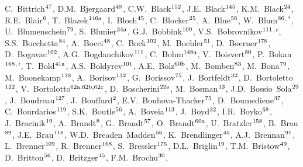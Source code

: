 \begin{flushleft}
C.~Bittrich$^\textrm{\scriptsize 47}$,
D.M.~Bjergaard$^\textrm{\scriptsize 48}$,
C.W.~Black$^\textrm{\scriptsize 152}$,
J.E.~Black$^\textrm{\scriptsize 145}$,
K.M.~Black$^\textrm{\scriptsize 24}$,
R.E.~Blair$^\textrm{\scriptsize 6}$,
T.~Blazek$^\textrm{\scriptsize 146a}$,
I.~Bloch$^\textrm{\scriptsize 45}$,
C.~Blocker$^\textrm{\scriptsize 25}$,
A.~Blue$^\textrm{\scriptsize 56}$,
W.~Blum$^\textrm{\scriptsize 86}$$^{,*}$,
U.~Blumenschein$^\textrm{\scriptsize 79}$,
S.~Blunier$^\textrm{\scriptsize 34a}$,
G.J.~Bobbink$^\textrm{\scriptsize 109}$,
V.S.~Bobrovnikov$^\textrm{\scriptsize 111}$$^{,c}$,
S.S.~Bocchetta$^\textrm{\scriptsize 84}$,
A.~Bocci$^\textrm{\scriptsize 48}$,
C.~Bock$^\textrm{\scriptsize 102}$,
M.~Boehler$^\textrm{\scriptsize 51}$,
D.~Boerner$^\textrm{\scriptsize 178}$,
D.~Bogavac$^\textrm{\scriptsize 102}$,
A.G.~Bogdanchikov$^\textrm{\scriptsize 111}$,
C.~Bohm$^\textrm{\scriptsize 148a}$,
V.~Boisvert$^\textrm{\scriptsize 80}$,
P.~Bokan$^\textrm{\scriptsize 168}$$^{,i}$,
T.~Bold$^\textrm{\scriptsize 41a}$,
A.S.~Boldyrev$^\textrm{\scriptsize 101}$,
A.E.~Bolz$^\textrm{\scriptsize 60b}$,
M.~Bomben$^\textrm{\scriptsize 83}$,
M.~Bona$^\textrm{\scriptsize 79}$,
M.~Boonekamp$^\textrm{\scriptsize 138}$,
A.~Borisov$^\textrm{\scriptsize 132}$,
G.~Borissov$^\textrm{\scriptsize 75}$,
J.~Bortfeldt$^\textrm{\scriptsize 32}$,
D.~Bortoletto$^\textrm{\scriptsize 122}$,
V.~Bortolotto$^\textrm{\scriptsize 62a,62b,62c}$,
D.~Boscherini$^\textrm{\scriptsize 22a}$,
M.~Bosman$^\textrm{\scriptsize 13}$,
J.D.~Bossio~Sola$^\textrm{\scriptsize 29}$,
J.~Boudreau$^\textrm{\scriptsize 127}$,
J.~Bouffard$^\textrm{\scriptsize 2}$,
E.V.~Bouhova-Thacker$^\textrm{\scriptsize 75}$,
D.~Boumediene$^\textrm{\scriptsize 37}$,
C.~Bourdarios$^\textrm{\scriptsize 119}$,
S.K.~Boutle$^\textrm{\scriptsize 56}$,
A.~Boveia$^\textrm{\scriptsize 113}$,
J.~Boyd$^\textrm{\scriptsize 32}$,
I.R.~Boyko$^\textrm{\scriptsize 68}$,
J.~Bracinik$^\textrm{\scriptsize 19}$,
A.~Brandt$^\textrm{\scriptsize 8}$,
G.~Brandt$^\textrm{\scriptsize 57}$,
O.~Brandt$^\textrm{\scriptsize 60a}$,
U.~Bratzler$^\textrm{\scriptsize 158}$,
B.~Brau$^\textrm{\scriptsize 89}$,
J.E.~Brau$^\textrm{\scriptsize 118}$,
W.D.~Breaden~Madden$^\textrm{\scriptsize 56}$,
K.~Brendlinger$^\textrm{\scriptsize 45}$,
A.J.~Brennan$^\textrm{\scriptsize 91}$,
L.~Brenner$^\textrm{\scriptsize 109}$,
R.~Brenner$^\textrm{\scriptsize 168}$,
S.~Bressler$^\textrm{\scriptsize 175}$,
D.L.~Briglin$^\textrm{\scriptsize 19}$,
T.M.~Bristow$^\textrm{\scriptsize 49}$,
D.~Britton$^\textrm{\scriptsize 56}$,
D.~Britzger$^\textrm{\scriptsize 45}$,
F.M.~Brochu$^\textrm{\scriptsize 30}$,
$$
\end{flushleft}
